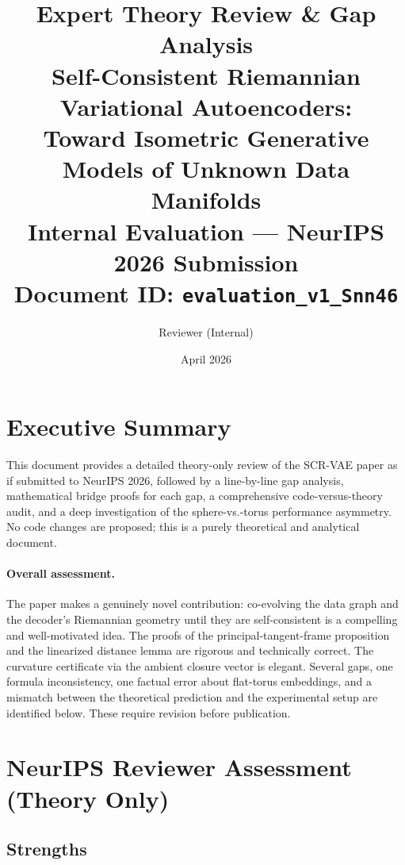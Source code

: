\documentclass[11pt]{article}
\title{\textbf{Expert Theory Review \& Gap Analysis}\\
\large Self-Consistent Riemannian Variational Autoencoders:\\
Toward Isometric Generative Models of Unknown Data Manifolds\\[6pt]
\normalsize Internal Evaluation --- NeurIPS 2026 Submission\\
Document ID: \texttt{evaluation\_v1\_Snn46}}
\author{Reviewer (Internal)}
\date{April 2026}
\begin{document}
\maketitle

\tableofcontents
\newpage

\section{Executive Summary}

This document provides a detailed theory-only review of the SCR-VAE paper as if
submitted to NeurIPS 2026, followed by a line-by-line gap analysis, mathematical
bridge proofs for each gap, a comprehensive code-versus-theory audit, and a
deep investigation of the sphere-vs.-torus performance asymmetry. No code
changes are proposed; this is a purely theoretical and analytical document.

\paragraph{Overall assessment.}
The paper makes a genuinely novel contribution: co-evolving the data graph and
the decoder's Riemannian geometry until they are self-consistent is a compelling
and well-motivated idea. The proofs of the principal-tangent-frame proposition
and the linearized distance lemma are rigorous and technically correct. The
curvature certificate via the ambient closure vector is elegant. Several gaps,
one formula inconsistency, one factual error about flat-torus embeddings, and
a mismatch between the theoretical prediction and the experimental setup are
identified below. These require revision before publication.

\section{NeurIPS Reviewer Assessment (Theory Only)}

\subsection{Strengths}
\end{document}
